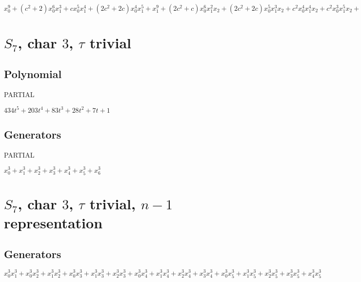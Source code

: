 \documentclass{article}
\numberwithin{equation}{section}
\begin{document}
$x_0^9 + (c^2 + 2)x_0^6x_1^3 + cx_0^5x_1^4 + (2c^2 + 2c)x_0^4x_1^5 + x_1^9 + (2c^2 + c)x_0^6x_1^2x_2 + (2c^2 + 2c)x_0^5x_1^3x_2 + c^2x_0^4x_1^4x_2 + c^2x_0^3x_1^5x_2 + (c^2 + 2c)x_0^6x_1x_2^2 + 2c^2x_0^5x_1^2x_2^2 + cx_0^4x_1^3x_2^2 + c^2x_0^3x_1^4x_2^2 + 2c^2x_0^2x_1^5x_2^2 + x_2^9$

\section{$S_7$, char $3$, $\tau$ trivial}

\subsection{Polynomial}

PARTIAL

$434t^5+203t^4+83t^3+28t^2+7t+1$

\subsection{Generators}

PARTIAL

$x_0^3 + x_1^3 + x_2^3 + x_3^3 + x_4^3 + x_5^3 + x_6^3$



       	
\section{$S_7$, char $3$, $\tau$ trivial, $n-1$ representation}

\subsection{Generators}


$x_0^3x_1^3 + x_0^3x_2^3 + x_1^3x_2^3 + x_0^3x_3^3 + x_1^3x_3^3 +
x_2^3x_3^3 + x_0^3x_4^3 + x_1^3x_4^3 + x_2^3x_4^3 + x_3^3x_4^3 +
x_0^3x_5^3 + x_1^3x_5^3 + x_2^3x_5^3 + x_3^3x_5^3 + x_4^3x_5^3$
\end{document}
